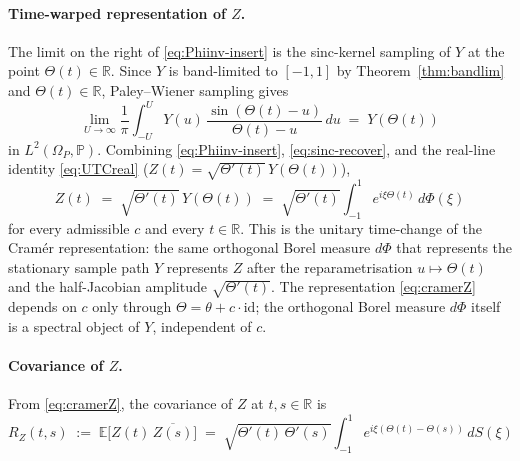\documentclass[11pt]{article}
\begin{document}
\paragraph{Time-warped representation of $Z$.} The limit on the right of \eqref{eq:Phiinv-insert} is the sinc-kernel sampling of $Y$ at the point $\Theta(t)\in\mathbb{R}$. Since $Y$ is band-limited to $[-1,1]$ by Theorem~\ref{thm:bandlim} and $\Theta(t)\in\mathbb{R}$, Paley--Wiener sampling gives
\begin{equation}\label{eq:sinc-recover}
\lim_{U\to\infty}\frac{1}{\pi}\int_{-U}^{U}Y(u)\,\frac{\sin(\Theta(t)-u)}{\Theta(t)-u}\,du \;=\; Y(\Theta(t))
\end{equation}
in $L^2(\Omega_P,\mathbb{P})$. Combining \eqref{eq:Phiinv-insert}, \eqref{eq:sinc-recover}, and the real-line identity \eqref{eq:UTCreal} ($Z(t)=\sqrt{\Theta'(t)}\,Y(\Theta(t))$),
\begin{equation}\label{eq:cramerZ}
Z(t) \;=\; \sqrt{\Theta'(t)}\,Y(\Theta(t)) \;=\; \sqrt{\Theta'(t)}\int_{-1}^{1} e^{i\xi\Theta(t)}\,d\Phi(\xi)
\end{equation}
for every admissible $c$ and every $t\in\mathbb{R}$. This is the unitary time-change of the Cram\'er representation: the same orthogonal Borel measure $d\Phi$ that represents the stationary sample path $Y$ represents $Z$ after the reparametrisation $u\mapsto\Theta(t)$ and the half-Jacobian amplitude $\sqrt{\Theta'(t)}$. The representation \eqref{eq:cramerZ} depends on $c$ only through $\Theta=\theta+c\cdot\mathrm{id}$; the orthogonal Borel measure $d\Phi$ itself is a spectral object of $Y$, independent of $c$.

\paragraph{Covariance of $Z$.} From \eqref{eq:cramerZ}, the covariance of $Z$ at $t,s\in\mathbb{R}$ is
\begin{equation}\label{eq:RZ}
R_Z(t,s) \;:=\; \mathbb{E}\bigl[Z(t)\,\overline{Z(s)}\bigr] \;=\; \sqrt{\Theta'(t)\,\Theta'(s)}\int_{-1}^{1} e^{i\xi(\Theta(t)-\Theta(s))}\,dS(\xi)
\end{equation}
\end{document}
